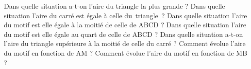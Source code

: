 \exercice Dans quelle situation a-t-on l'aire du triangle la plus grande ?
\exercice Dans quelle situation l'aire du carré est égale à celle du~triangle~?
\exercice Dans quelle situation l'aire du motif est elle égale à la moitié de celle de ABCD ?
\exerciceprime Dans quelle situation l'aire du motif est elle égale au quart de celle de ABCD ?
\exercice Dans quelle situation a-t-on l'aire du triangle supérieure à la moitié de celle du carré ?
\exercice Comment évolue l'aire du motif en fonction de AM ?
\exerciceprime Comment évolue l'aire du motif en fonction de MB ?
